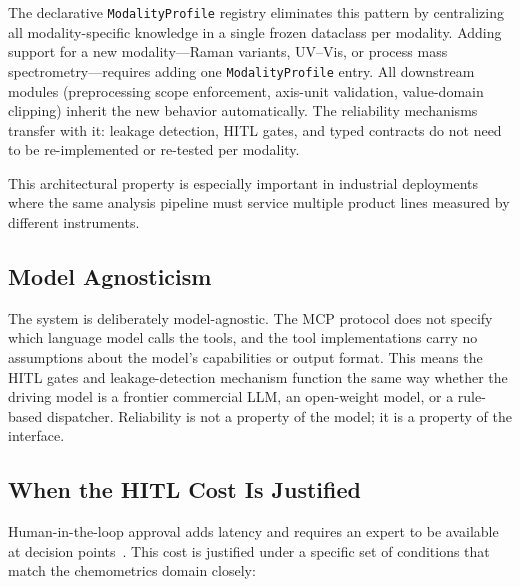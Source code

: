 The declarative \texttt{ModalityProfile} registry eliminates this pattern
by centralizing all modality-specific knowledge in a single frozen dataclass
per modality.
Adding support for a new modality---Raman variants, UV--Vis, or process mass
spectrometry---requires adding one \texttt{ModalityProfile} entry.
All downstream modules (preprocessing scope enforcement, axis-unit
validation, value-domain clipping) inherit the new behavior automatically.
The reliability mechanisms transfer with it: leakage detection, HITL gates,
and typed contracts do not need to be re-implemented or re-tested per modality.

This architectural property is especially important in industrial deployments
where the same analysis pipeline must service multiple product lines measured
by different instruments.

\subsection{Model Agnosticism}

The system is deliberately model-agnostic.
The MCP protocol does not specify which language model calls the tools, and
the tool implementations carry no assumptions about the model's capabilities
or output format.
This means the HITL gates and leakage-detection mechanism function the same
way whether the driving model is a frontier commercial LLM, an open-weight
model, or a rule-based dispatcher.
Reliability is not a property of the model; it is a property of the interface.

\subsection{When the HITL Cost Is Justified}

Human-in-the-loop approval adds latency and requires an expert to be
available at decision points~\citep{monarch2021hitl}.
This cost is justified under a specific set of conditions that match the
chemometrics domain closely:

